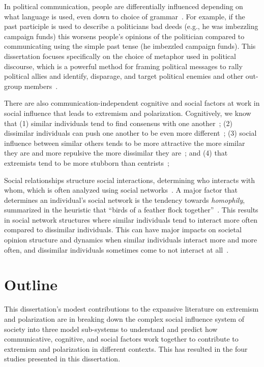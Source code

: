 In political communication, people are differentially
influenced depending on what language is used, even down to choice of 
grammar~\cite{Matlock2012}. For example, if the past participle is used
to describe a politicians bad deeds (e.g., he was imbezzling campaign
funds) this worsens people's opinions of the politician compared to 
communicating using the simple past tense (he imbezzled campaign funds).
This dissertation focuses specifically on the choice of metaphor used 
in political discourse, which is a powerful method for framing political 
messages to rally political allies and identify, disparage, and target
political enemies and other out-group members~\cite{OBrien2003,Charteris-Black2009,Landau2010}.

There are also communication-independent cognitive and social factors at work
in social influence that leads to extremism and polarization. Cognitively,
we know that (1) similar individuals tend to find consensus with one another~\cite{French1956,DeGroot1974};
(2) dissimilar individuals can push one another to be even more 
different~\cite{Cikara2014,Bail2018};
(3) social influence between similar others tends to be more attractive the more
similar they are and more repulsive the more dissimilar they are~\cite{Lord1979,Ross2012};
and (4) that extremists tend to be more stubborn than centrists~\cite{Reiss2019,Zmigrod2019a};

Social relationships structure social interactions, determining who interacts
with whom, which is often analyzed using social
networks~\cite{Watts1999}. A major factor that determines an individual's social
network is the tendency towards \emph{homophily}, summarized in the heuristic
that ``birds of a feather flock together''~\cite{McPherson2001}. This results
in social network structures where similar individuals tend to interact more
often compared to dissimilar individuals. This can have major impacts on 
societal opinion structure and dynamics when similar individuals interact more
and more often, and dissimilar individuals sometimes come to not interact at
all~\cite{Axelrod1997,Centola2007,DellaPosta2015}.

\section{Outline}

This dissertation's modest contributions to the expansive literature on extremism
and polarization are in breaking down the complex social influence system of
society into three model sub-systems to understand and predict how communicative,
cognitive, and social factors work together to contribute to extremism and polarization
in different contexts. This has resulted in the four studies presented in this dissertation.

